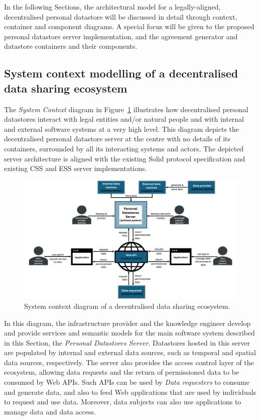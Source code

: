 In the following Sections, the architectural model for a legally-aligned, decentralised personal datastore will be discussed in detail through context, container and component diagrams.
A special focus will be given to the proposed personal datastore server implementation, and the agreement generator and datastore containers and their components. 

\subsection{System context modelling of a decentralised data sharing ecosystem}
\label{sec:c4_context}

The \textit{System Context} diagram in Figure~\ref{fig:c4-context} illustrates how decentralised personal datastores interact with legal entities and/or natural people and with internal and external software systems at a very high level.
This diagram depicts the decentralised personal datastore server at the centre with no details of its containers, surrounded by all its interacting systems and actors.
The depicted server architecture is aligned with the existing Solid protocol specification and existing CSS and ESS server implementations.

\begin{figure}[ht]
    \centering
    \includegraphics[width=1\linewidth]{figures//chapter-6/system-context-diagram.png}
    \caption{System context diagram of a decentralised data sharing ecosystem.}
    \label{fig:c4-context}
\end{figure}

In this diagram, the infrastructure provider and the knowledge engineer develop and provide services and semantic models for the main software system described in this Section, the \textit{Personal Datastores Server}.
Datastores hosted in this server are populated by internal and external data sources, such as temporal and spatial data sources, respectively.
The server also provides the access control layer of the ecosystem, allowing data requests and the return of permissioned data to be consumed by Web APIs.
Such APIs can be used by \textit{Data requesters} to consume and generate data, and also to feed Web applications that are used by individuals to request and use data.
Moreover, data subjects can also use applications to manage data and data access.



